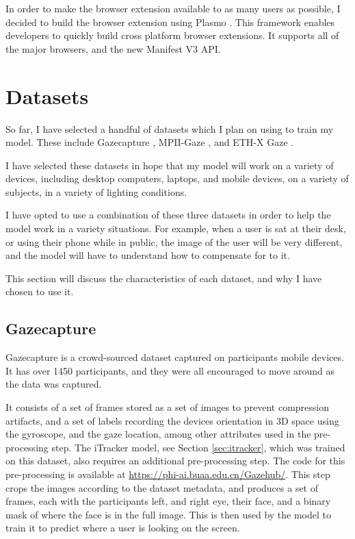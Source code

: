 \documentclass[twocolumn]{report}
\begin{document}
In order to make the browser extension available to as many users as possible, I decided to build the browser extension using Plasmo \cite{plasmo}. This framework enables developers to quickly build cross platform browser extensions. It supports all of the major browsers, and the new Manifest V3 API. 

\section{Datasets}\label{sec:datasets}

So far, I have selected a handful of datasets which I plan on using to train my model. These include Gazecapture \cite{krafka2016eye}, MPII-Gaze \cite{zhang15cvpr}, and ETH-X Gaze \cite{zhang2020ethxgaze}. 

I have selected these datasets in hope that my model will work on a variety of devices, including desktop computers, laptops, and mobile devices, on a variety of subjects, in a variety of lighting conditions. 

I have opted to use a combination of these three datasets in order to help the model work in a variety situations. For example, when a user is sat at their desk, or using their phone while in public, the image of the user will be very different, and the model will have to understand how to compensate for to it.  

This section will discuss the characteristics of each dataset, and why I have chosen to use it. 

\subsection{Gazecapture}

Gazecapture \cite{krafka2016eye} is a crowd-sourced dataset captured on participants mobile devices. It has over 1450 participants, and they were all encouraged to move around as the data was captured. 

It consists of a set of frames stored as a set of images to prevent compression artifacts, and a set of labels recording the devices orientation in 3D space using the gyroscope, and the gaze location, among other attributes used in the pre-processing step. The iTracker model, see Section \ref{sec:itracker}, which was trained on this dataset, also requires an additional pre-processing step. The code for this pre-processing is available at \url{https://phi-ai.buaa.edu.cn/Gazehub/}. This step crops the images according to the dataset metadata, and produces a set of frames, each with the participants left, and right eye, their face, and a binary mask of where the face is in the full image. This is then used by the model to train it to predict where a user is looking on the screen. 
\end{document}
